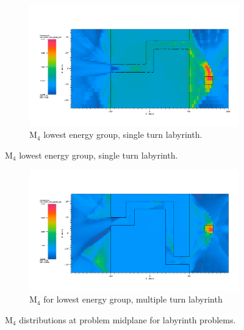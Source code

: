\begin{figure}[htb!]
  \centering
  \begin{subfigure}[t]{\textwidth}
    \includegraphics[width=0.9\linewidth]{./chapters/characterization_probs/figures/char/maze2/maze2M4G26.png}
    \caption{M$_4$ lowest energy group, single turn
    labyrinth.}
    \label{fig:maze2M4}
  \end{subfigure}
\end{figure}
\begin{figure}[htb!]\ContinuedFloat
  \centering
  \begin{subfigure}[t]{\textwidth}
    \includegraphics[width=0.9\linewidth]{./chapters/characterization_probs/figures/char/maze1/maze1M4G026.png}
    \caption{M$_4$ for lowest energy group, multiple turn labyrinth }
    \label{fig:maze1M4}
  \end{subfigure}
  \caption[M$_4$ distributions at problem midplane for labyrinth problems]{M$_4$
  distributions at problem midplane for labyrinth problems.}
  \label{fig:labyrinthM4}
\end{figure}

